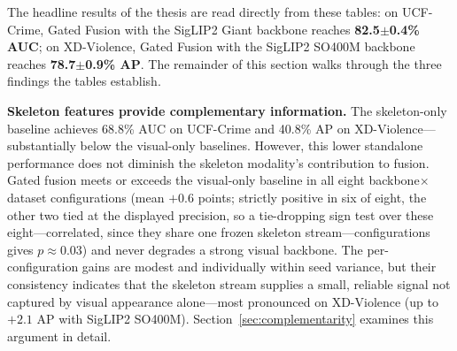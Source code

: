 \begin{table}[t]
\centering
\caption[Ablation study on XD-Violence (AP, three seeds)]{Ablation study on XD-Violence. AP (\%) reported for each fusion variant across four visual backbones. All rows show mean$\pm$std over three seeds. Best result per row in \textbf{bold}. $\Delta$ relative to CLIP ViT-B/16 baseline.}
\label{tab:xd-ablation}
\end{table}

The headline results of the thesis are read directly from these tables: on
UCF-Crime, Gated Fusion with the SigLIP2 Giant backbone reaches
\textbf{82.5$\pm$0.4\% AUC}; on XD-Violence, Gated Fusion with the SigLIP2
SO400M backbone reaches \textbf{78.7$\pm$0.9\% AP}. The remainder of this
section walks through the three findings the tables establish.

\textbf{Skeleton features provide complementary information.} The
skeleton-only baseline achieves 68.8\% AUC on UCF-Crime and 40.8\% AP on
XD-Violence---substantially below the visual-only baselines. However, this
lower standalone performance does not diminish the skeleton modality's
contribution to fusion. Gated fusion meets or exceeds the visual-only baseline
in all eight backbone$\times$dataset configurations (mean $+0.6$ points;
strictly positive in six of eight, the other two tied at the displayed
precision, so a tie-dropping sign test over these eight---correlated, since
they share one frozen skeleton stream---configurations gives $p\approx0.03$)
and never degrades a strong visual backbone. The per-configuration gains are
modest and individually within seed variance, but their consistency indicates
that the skeleton stream supplies a small, reliable signal not captured by
visual appearance alone---most pronounced on XD-Violence (up to $+2.1$ AP with
SigLIP2 SO400M). Section~\ref{sec:complementarity} examines this argument in
detail.

